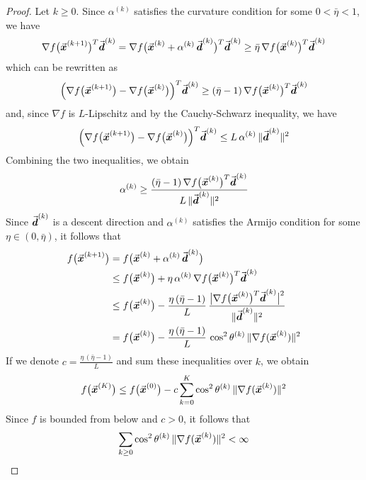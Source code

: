\begin{proof}
Let \(k \ge 0\). Since \(\alpha^{(k)}\) satisfies the curvature condition for some \(0 < \bar{\eta} < 1\), we have
\[
\nabla f\bigl(\vect{x}^{(k+1)}\bigr)^T \vect{d}^{(k)} = \nabla f\bigl(\vect{x}^{(k)} + \alpha^{(k)}\, \vect{d}^{(k)}\bigr)^T \vect{d}^{(k)} \ge \bar{\eta}\, \nabla f\bigl(\vect{x}^{(k)}\bigr)^T \vect{d}^{(k)} %
\]
which can be rewritten as
\[
\Bigl(\nabla f\bigl(\vect{x}^{(k+1)}\bigr)-\nabla f\bigl(\vect{x}^{(k)}\bigr)\Bigr)^T \vect{d}^{(k)} \ge (\bar{\eta} - 1)\, \nabla f\bigl(\vect{x}^{(k)}\bigr)^T \vect{d}^{(k)} %
\]
and, since \(\nabla f\) is \(L\)-Lipschitz and by the Cauchy-Schwarz inequality, we have
\[
\Bigl(\nabla f\bigl(\vect{x}^{(k+1)}\bigr)-\nabla f\bigl(\vect{x}^{(k)}\bigr)\Bigr)^T \vect{d}^{(k)} \le L\, \alpha^{(k)}\, \|\vect{d}^{(k)}\|^2 %
\]
Combining the two inequalities, we obtain
\[
\alpha^{(k)} \ge \frac{(\bar{\eta}-1)\, \nabla f\bigl(\vect{x}^{(k)}\bigr)^T \vect{d}^{(k)}}{L\, \|\vect{d}^{(k)}\|^2} %
\]
Since \(\vec{\boldsymbol{d}}^{(k)}\) is a descent direction and \(\alpha^{(k)}\) satisfies the Armijo condition for some \(\eta \in (0,\bar{\eta})\), it follows that
\[
\begin{aligned}
f\bigl(\vect{x}^{(k+1)}\bigr) &= f\bigl(\vect{x}^{(k)} + \alpha^{(k)}\, \vect{d}^{(k)}\bigr) \\
&\le f\bigl(\vect{x}^{(k)}\bigr) + \eta\, \alpha^{(k)}\, \nabla f\bigl(\vect{x}^{(k)}\bigr)^T \vect{d}^{(k)} \\
&\le f\bigl(\vect{x}^{(k)}\bigr) - \frac{\eta\, (\bar{\eta}-1)}{L}\, \frac{\bigl|\nabla f\bigl(\vect{x}^{(k)}\bigr)^T \vect{d}^{(k)}\bigr|^2}{\|\vect{d}^{(k)}\|^2} \\
&= f\bigl(\vect{x}^{(k)}\bigr) - \frac{\eta\, (\bar{\eta}-1)}{L}\, \cos^2\theta^{(k)}\, \|\nabla f(\vect{x}^{(k)})\|^2 %
\end{aligned}
\]
If we denote \(c = \frac{\eta\, (\bar{\eta}-1)}{L}\) and sum these inequalities over \(k\), we obtain
\[
f\bigl(\vect{x}^{(K)}\bigr) \le f\bigl(\vect{x}^{(0)}\bigr) - c \sum_{k=0}^{K} \cos^2\theta^{(k)}\, \|\nabla f(\vect{x}^{(k)})\|^2 %
\]
Since \(f\) is bounded from below and \(c > 0\), it follows that
\[
\sum_{k \geq 0} \cos^2\theta^{(k)}\, \|\nabla f(\vect{x}^{(k)})\|^2 < \infty %
\]
\end{proof}

